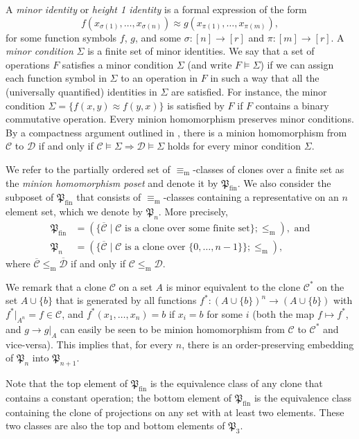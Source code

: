 \documentclass[12pt]{amsart}
\theoremstyle{definition}
\theoremstyle{definition}
\newcommand{\Pfin}{\mathfrak P_{\mathrm{fin}}}
\newcommand{\Pthree}{\mathfrak P_{3}}
\newcommand{\Pn}{\mathfrak P_{n}}
\newcommand{\clo}[1]{\mathcal{#1}}
\newcommand{\isaminorof}{\leq_{\mathrm{m}}}
\newcommand{\minorequivalentto}{\equiv_{\mathrm{m}}}
\begin{document}
A \emph{minor identity} or \emph{height 1 identity} is a formal expression of the form 
\[f(x_{\sigma(1)},\dots,x_{\sigma(n)}) \approx g(x_{\pi(1)},\dots,x_{\pi(m)}),\] 
for some function symbols $f$, $g$, and some $\sigma\colon [n] \to [r]$ and $\pi\colon [m] \to [r]$. A \emph{minor condition} $\Sigma$ is a finite set of minor identities. 
We say that a set of operations $F$ satisfies a minor condition $\Sigma$ (and write $F\models \Sigma$) if we can assign each function symbol in $\Sigma$ to an operation in $F$ in such a way that all the (universally quantified) identities in $\Sigma$ are satisfied. For instance, the minor condition $\Sigma = \{f(x,y) \approx f(y,x) \}$ is satisfied by $F$ if $F$ contains a binary commutative operation. 
Every minion homomorphism preserves minor conditions. By a compactness argument outlined in \cite{wonderland}, there is a minion homomorphism from $\clo{C}$ to $\clo{D}$ if and only if $\clo{C} \models \Sigma \Rightarrow \clo{D} \models \Sigma$ holds for every minor condition $\Sigma$. 

We refer to the partially ordered set of $\minorequivalentto$-classes of clones over a finite set as the \emph{minion homomorphism poset} and denote it by $\Pfin$. We also consider the subposet of $\Pfin$ that consists of $\minorequivalentto$-classes containing a representative on an $n$ element set, which we denote by $\Pn$. More precisely,
\begin{align*}
    \Pfin &=(\{\overline{\clo{C}}\mid \clo{C}\text{ is a clone over some finite set}\}; \isaminorof), \text{ and}\\
    \Pn &=(\{\overline{\clo{C}}\mid \clo{C}\text{ is a clone over } \{0,\dots,n-1\}\}; \isaminorof),
\end{align*}
where $\overline{\clo{C}}\isaminorof\overline{\clo{D}}$ if and only if $\clo{C}\isaminorof\clo{D}$. 

We remark that a clone $\clo{C}$ on a set $A$ is minor equivalent to the clone $\clo{C^*}$ on the set $A \cup \{b\}$ that is generated by all functions $f^* \colon (A \cup \{b\})^n \to (A \cup \{b\})$ with $f^*|_{A^n} = f \in \clo{C}$, and $f^*(x_1,\ldots,x_n) = b$ if $x_i = b$ for some $i$ (both the map $f \mapsto f^*$, and $g \to g|_A$ can easily be seen to be minion homomorphism from $\clo{C}$ to $\clo{C^*}$ and vice-versa). This implies that, for every $n$, there is an order-preserving embedding of $\Pn$ into $\mathfrak P_{n+1}$.

Note that the top element of $\Pfin$ is the equivalence class of any clone that contains a constant operation; the bottom element of $\Pfin$ is the equivalence class containing the clone of projections on any set with at least two elements. These two classes are also the top and bottom elements of $\Pthree$.
\end{document}
